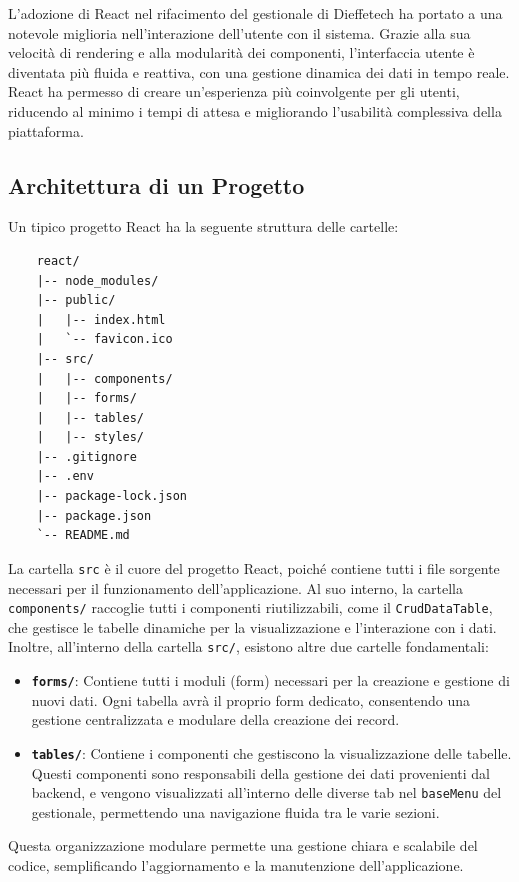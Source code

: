 L'adozione di React nel rifacimento del gestionale di Dieffetech ha portato a una notevole miglioria nell'interazione dell'utente con il sistema. Grazie alla sua velocità di rendering e alla modularità dei componenti, l'interfaccia utente è diventata più fluida e reattiva, con una gestione dinamica dei dati in tempo reale. React ha permesso di creare un'esperienza più coinvolgente per gli utenti, riducendo al minimo i tempi di attesa e migliorando l'usabilità complessiva della piattaforma.

\subsection{Architettura di un Progetto}
Un tipico progetto React ha la seguente struttura delle cartelle:

\begin{verbatim}
    react/
    |-- node_modules/
    |-- public/
    |   |-- index.html
    |   `-- favicon.ico
    |-- src/
    |   |-- components/
    |   |-- forms/
    |   |-- tables/
    |   |-- styles/
    |-- .gitignore
    |-- .env
    |-- package-lock.json
    |-- package.json
    `-- README.md
    \end{verbatim}
La cartella \texttt{src} è il cuore del progetto React, poiché contiene tutti i file sorgente necessari per il funzionamento dell'applicazione. Al suo interno, la cartella \texttt{components/} raccoglie tutti i componenti riutilizzabili, come il \texttt{CrudDataTable}, che gestisce le tabelle dinamiche per la visualizzazione e l'interazione con i dati.
Inoltre, all'interno della cartella \texttt{src/}, esistono altre due cartelle fondamentali:

\begin{itemize}
    \item \textbf{\texttt{forms/}}: Contiene tutti i moduli (form) necessari per la creazione e gestione di nuovi dati. Ogni tabella avrà il proprio form dedicato, consentendo una gestione centralizzata e modulare della creazione dei record.
    \item \textbf{\texttt{tables/}}: Contiene i componenti che gestiscono la visualizzazione delle tabelle. Questi componenti sono responsabili della gestione dei dati provenienti dal backend, e vengono visualizzati all'interno delle diverse tab nel \texttt{baseMenu} del gestionale, permettendo una navigazione fluida tra le varie sezioni.
\end{itemize}

Questa organizzazione modulare permette una gestione chiara e scalabile del codice, semplificando l'aggiornamento e la manutenzione dell'applicazione.

